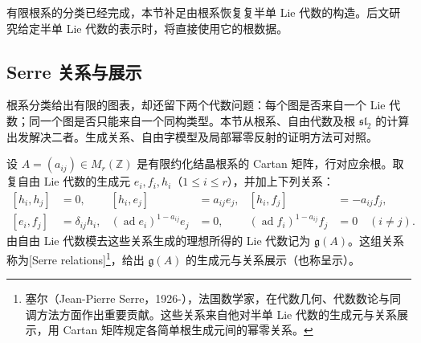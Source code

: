 

有限根系的分类已经完成，本节补足由根系恢复复半单 Lie 代数的构造。后文研究给定半单 Lie 代数的表示时，将直接使用它的根数据。


%
%

\subsection{Serre 关系与展示}
\label{b5:subsec:1704:01}

根系分类给出有限的图表，却还留下两个代数问题：每个图是否来自一个 Lie 代数；同一个图是否只能来自一个同构类型。本节从根系、自由代数及根 \(\mathfrak{sl}_2\) 的计算出发解决二者。生成关系、自由字模型及局部幂零反射的证明方法可对照\cite[Sections 18.1--18.4, pp. 96--101]{Humphreys1972LieAlgebras}。

\begin{definition}\label{b5:def:serre-algebra}
	设 \(A=(a_{ij})\in M_r(\mathbb Z)\) 是有限约化结晶根系的 Cartan 矩阵，行对应余根。取复自由 Lie 代数的生成元 \(e_i,f_i,h_i\)（\(1\leq i\leq r\)），并加上下列关系：
	\begin{equation}\label{b5:eq:serre-relations}
		\begin{aligned}
			[h_i,h_j]&=0,& [h_i,e_j]&=a_{ij}e_j,& [h_i,f_j]&=-a_{ij}f_j,\\
			[e_i,f_j]&=\delta_{ij}h_i,& (\operatorname{ad}e_i)^{1-a_{ij}}e_j&=0,& (\operatorname{ad}f_i)^{1-a_{ij}}f_j&=0\quad(i\ne j).
		\end{aligned}
	\end{equation}
	由自由 Lie 代数模去这些关系生成的理想所得的 Lie 代数记为 \(\mathfrak g(A)\)。这组关系称为[Serre relations]\footnote{塞尔（Jean-Pierre Serre，1926-），法国数学家，在代数几何、代数数论与同调方法方面作出重要贡献。这些关系来自他对半单 Lie 代数的生成元与关系展示，用 Cartan 矩阵规定各简单根生成元间的幂零关系。}，给出 \(\mathfrak g(A)\) 的生成元与关系展示（也称呈示）。
\end{definition}

